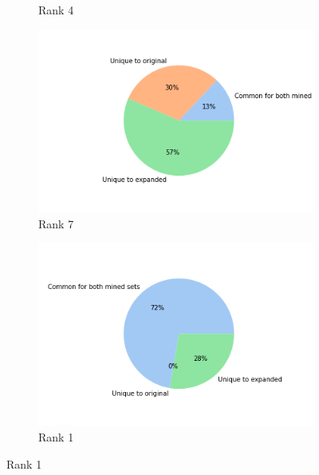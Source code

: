 \begin{figure}[!htbp]
\begin{subfigure}[b]{0.3\textwidth}
            \caption[]%
            {{\small Rank 4}}    
            \label{fig:rank_4_pie_wn18rr}
        \end{subfigure}
        \begin{subfigure}[b]{0.3\textwidth}   
            \centering 
            \includegraphics[width=\textwidth]{figures/results/ranks/pie_charts/('rank_cutoff', 7)_wn18rr.png}
            \caption[]%
            {{\small Rank 7}}    
            \label{fig:rank_7_pie_wn18rr}
        \end{subfigure}
        \begin{subfigure}[b]{0.3\textwidth}
            \centering
            \includegraphics[width=\textwidth]{figures/results/ranks/pie_charts/('rank_cutoff', 1)_family.png}
            \caption[]%
            {{\small Rank 1}}    
            \label{fig:rank_1_pie_family}
        \end{subfigure}

\end{figure}
